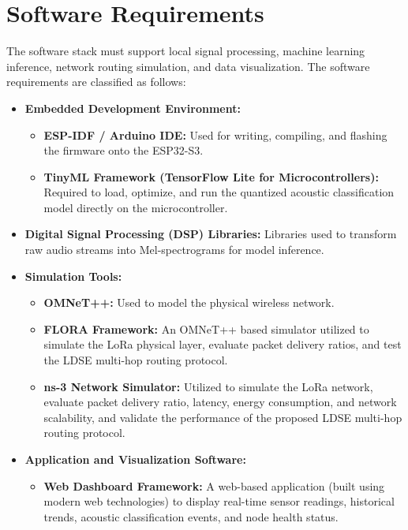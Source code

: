 \section{Software Requirements}
The software stack must support local signal processing, machine learning inference, network routing simulation, and data visualization. The software requirements are classified as follows:

\begin{itemize}
    \item \textbf{Embedded Development Environment:} 
    \begin{itemize}
        \item \textbf{ESP-IDF / Arduino IDE:} Used for writing, compiling, and flashing the firmware onto the ESP32-S3.
        \item \textbf{TinyML Framework (TensorFlow Lite for Microcontrollers):} Required to load, optimize, and run the quantized acoustic classification model directly on the microcontroller.
    \end{itemize}
    
    \item \textbf{Digital Signal Processing (DSP) Libraries:}
    Libraries used to transform raw audio streams into Mel-spectrograms for
    model inference.
    
    \item \textbf{Simulation Tools:} 
    \begin{itemize}
        \item \textbf{OMNeT++:} Used to model the physical wireless network.
        \item \textbf{FLORA Framework:} An OMNeT++ based simulator utilized to simulate the LoRa physical layer, evaluate packet delivery ratios, and test the LDSE multi-hop routing protocol.
        \item \textbf{ns-3 Network Simulator:} Utilized to simulate the LoRa network, evaluate packet delivery ratio, latency, energy consumption, and network scalability, and validate the performance of the proposed LDSE multi-hop routing protocol.
    \end{itemize}
    
    \item \textbf{Application and Visualization Software:} 
    \begin{itemize}
        \item \textbf{Web Dashboard Framework:} A web-based application (built using modern web technologies) to display real-time sensor readings, historical trends, acoustic classification events, and node health status.
    \end{itemize}
\end{itemize}
